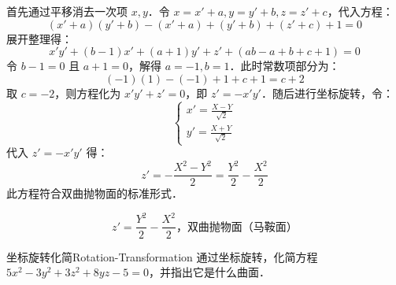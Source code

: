 \begin{solution}
    首先通过平移消去一次项 $x, y$．令 $x = x' + a, y = y' + b, z = z' + c$，代入方程：
    \begin{equation}
        (x' + a)(y' + b) - (x' + a) + (y' + b) + (z' + c) + 1 = 0
    \end{equation}
    展开整理得：
    \begin{equation}
        x'y' + (b - 1)x' + (a + 1)y' + z' + (ab - a + b + c + 1) = 0
    \end{equation}
    令 $b - 1 = 0$ 且 $a + 1 = 0$，解得 $a = -1, b = 1$．此时常数项部分为：
    \begin{equation}
        (-1)(1) - (-1) + 1 + c + 1 = c + 2
    \end{equation}
    取 $c = -2$，则方程化为 $x'y' + z' = 0$，即 $z' = -x'y'$．随后进行坐标旋转，令：
    \begin{equation}
        \begin{cases}
            x' = \frac{X - Y}{\sqrt{2}} \\
            y' = \frac{X + Y}{\sqrt{2}}
        \end{cases}
    \end{equation}
    代入 $z' = -x'y'$ 得：
    \begin{equation}
        z' = -\frac{X^2 - Y^2}{2} = \frac{Y^2}{2} - \frac{X^2}{2}
    \end{equation}
    此方程符合双曲抛物面的标准形式．

    \begin{equation}
        \boxed{z' = \frac{Y^2}{2} - \frac{X^2}{2}，\text{双曲抛物面（马鞍面）}}
    \end{equation}
\end{solution}

\begin{problem}{坐标旋转化简}{Rotation-Transformation}
    通过坐标旋转，化简方程 $5x^2 - 3y^2 + 3z^2 + 8yz - 5 = 0$，并指出它是什么曲面．
\end{problem}


